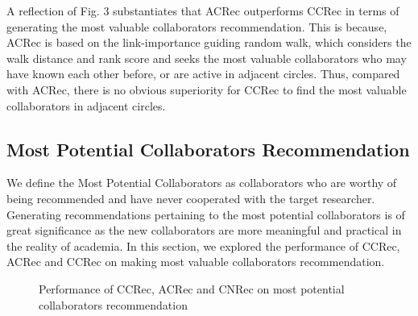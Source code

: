 \documentclass[review]{elsarticle}
\begin{document}
A reflection of Fig. 3 substantiates that ACRec outperforms CCRec in terms of generating the most valuable collaborators recommendation. This is because, ACRec is based on the link-importance guiding random walk, which considers the walk distance and rank score and seeks the most valuable collaborators who may have known each other before, or are active in adjacent circles. Thus, compared with ACRec, there is no obvious superiority for CCRec to find the most valuable collaborators in adjacent circles.

\subsection{Most Potential Collaborators Recommendation}
We define the Most Potential Collaborators as collaborators who are worthy of being recommended and have never cooperated with the target researcher. Generating recommendations pertaining to the most potential collaborators is of great significance as the new collaborators are more meaningful and practical in the reality of academia. In this section, we explored the performance of CCRec, ACRec and CCRec on making most valuable collaborators recommendation.

\begin{figure}
\centering
{}
\caption{Performance of CCRec, ACRec and CNRec on most potential collaborators recommendation}
\label{fig:4}       %
\end{figure}
\end{document}
